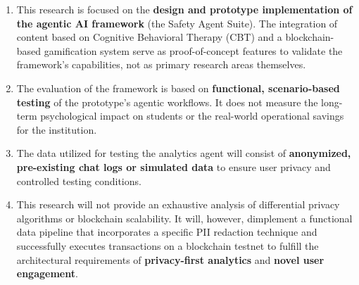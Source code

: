 \begin{enumerate}
    \item This research is focused on the \textbf{design and prototype implementation of the agentic AI framework} (the Safety Agent Suite). The integration of content based on Cognitive Behavioral Therapy (CBT) and a blockchain-based gamification system serve as proof-of-concept features to validate the framework's capabilities, not as primary research areas themselves.

    \item The evaluation of the framework is based on \textbf{functional, scenario-based testing} of the prototype's agentic workflows. It does not measure the long-term psychological impact on students or the real-world operational savings for the institution.

    \item The data utilized for testing the analytics agent will consist of \textbf{anonymized, pre-existing chat logs or simulated data} to ensure user privacy and controlled testing conditions.

    \item This research will not provide an exhaustive analysis of differential privacy algorithms or blockchain scalability. It will, however, dimplement a functional data pipeline that incorporates a specific PII redaction technique and successfully executes transactions on a blockchain testnet to fulfill the architectural requirements of \textbf{privacy-first analytics} and \textbf{novel user engagement}.
\end{enumerate}



